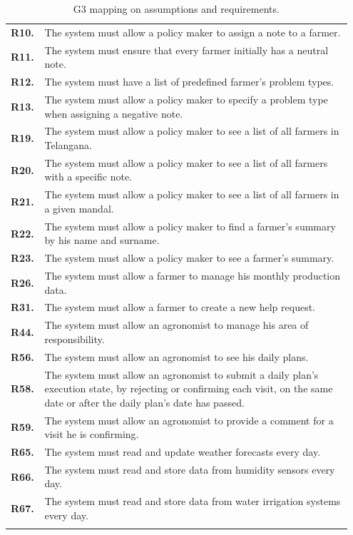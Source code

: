 \begin{longtable}{p{0.07\linewidth} p{0.88\linewidth}}
	\textbf{R10.} & The system must allow a policy maker to assign a note to a farmer.\\
	\textbf{R11.} & The system must ensure that every farmer initially has a neutral note.\\
	\textbf{R12.} & The system must have a list of predefined farmer's problem types.\\
    \textbf{R13.} & The system must allow a policy maker to specify a problem type when assigning a negative note.\\
	\textbf{R19.} & The system must allow a policy maker to see a list of all farmers in Telangana.\\
	\textbf{R20.} & The system must allow a policy maker to see a list of all farmers with a specific note.\\
	\textbf{R21.} & The system must allow a policy maker to see a list of all farmers in a given mandal.\\
	\textbf{R22.} & The system must allow a policy maker to find a farmer's summary by his name and surname.\\
	\textbf{R23.} & The system must allow a policy maker to see a farmer's summary.\\
	
	\textbf{R26.} & The system must allow a farmer to manage his monthly production data.\\
	\textbf{R31.} & The system must allow a farmer to create a new help request.\\
	
	\textbf{R44.} & The system must allow an agronomist to manage his area of responsibility.\\
	\textbf{R56.} & The system must allow an agronomist to see his daily plans.\\
	\textbf{R58.} & The system must allow an agronomist to submit a daily plan's execution state, by rejecting or confirming each visit, on the same date or after the daily plan's date has passed. \\
	\textbf{R59.} & The system must allow an agronomist to provide a comment for a visit he is confirming.\\
	
	\textbf{R65.} & The system must read and update weather forecasts every day. \\
	\textbf{R66.} & The system must read and store data from humidity sensors every day. \\
	\textbf{R67.} & The system must read and store data from water irrigation systems every day. \\
    \bottomrule
\caption{G3 mapping on assumptions and requirements.}
\end{longtable}


